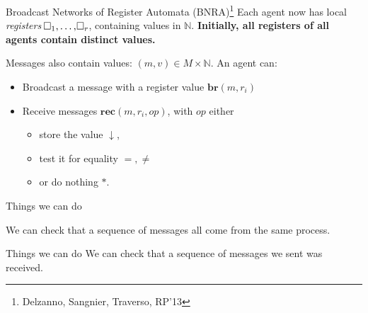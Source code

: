 \documentclass{beamer}
\newcommand{\reg}{\hspace{-0.5mm}\square}
\begin{document}
\begin{frame}{Broadcast Networks of Register Automata (BNRA)\footnote{Delzanno, Sangnier, Traverso, RP'13}}
	Each agent now has local \emph{registers} $\reg_1, \ldots, \reg_r$, containing values in $\mathbb{N}$.
	\pause
	\textbf{Initially, all registers of all agents contain distinct values.}
	
	\pause
	\vspace{0.2cm}
	Messages also contain values: $(m, v) \in M\times \mathbb{N}$.
	An agent can:
	\begin{itemize}
		\item Broadcast a message with a register value $\mathbf{br}(m, r_i)$\vspace{0.3cm}\pause
		
		
		\item Receive messages $\mathbf{rec}(m, r_i, op)$, with $op$ either
		\begin{itemize}
			\item store the value $\downarrow$,
			
			\item test it for equality $=, \neq$
			
			\item or do nothing $*$.
		\end{itemize}   
	\end{itemize}
\end{frame}

\begin{frame}{Things we can do}
	
	We can check that a sequence of messages all come from the same process.
	
	
\end{frame}

\begin{frame}{Things we can do}
	We can check that a sequence of messages we sent was received.
	
		
\end{frame}
\end{document}
